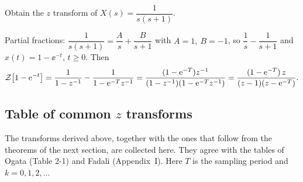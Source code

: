 \begin{example}
Obtain the $z$ transform of $X(s)=\dfrac{1}{s(s+1)}$.

Partial fractions: $\dfrac{1}{s(s+1)}=\dfrac{A}{s}+\dfrac{B}{s+1}$ with $A=1,\ B=-1$, so
$\dfrac{1}{s}-\dfrac{1}{s+1}$ and $x(t)=1-\ee^{-t}$, $t\ge0$. Then
\[
  \mathcal{Z}\!\left[1-\mathrm{e}^{-t}\right]=\frac{1}{1-z^{-1}}-\frac{1}{1-\mathrm{e}^{-T}z^{-1}}
  =\frac{(1-\mathrm{e}^{-T})z^{-1}}{(1-z^{-1})(1-\mathrm{e}^{-T}z^{-1})}
  =\frac{(1-\mathrm{e}^{-T})\,z}{(z-1)(z-\mathrm{e}^{-T})}.
\]
\end{example}

\subsection{Table of common $z$ transforms}
The transforms derived above, together with the ones that follow from the theorems of the next section, are
collected here. They agree with the tables of Ogata (Table 2-1) and Fadali (Appendix~I). Here $T$ is the
sampling period and $k=0,1,2,\dots$

